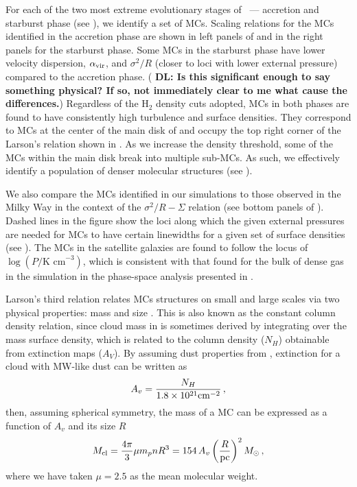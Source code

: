 \IfFileExists{emulateapjlegacy.cls}{\documentclass[iop]{emulateapjlegacy}}{\documentclass[iop]{emulateapj}}
\newcommand{\DL}[1]{({\bf \color{dlcolor} DL: #1})}
\begin{document}
For each of the two most extreme evolutionary stages of \flower\ --- accretion and starburst phase (see ), we identify a set of MCs. Scaling relations for the MCs identified in the accretion phase are shown in left panels of  and in the right panels for the starburst phase.
% 
Some MCs in the starburst phase have lower velocity dispersion, $\alpha_{\rm vir}$, and $\sigma^2/R$ (closer to loci with lower external pressure) compared to the accretion phase. \DL{Is this significant enough to say something physical? If so, not immediately clear to me what cause the differences.}
%
Regardless of the H$_2$ density cuts adopted, MCs in both phases are found to have consistently high turbulence and surface densities. They correspond to MCs at the center of the main disk of \flower and occupy the top right corner of the Larson's relation shown in . As we increase the density threshold, some of the MCs within the main disk break into multiple sub-MCs. As such, we effectively identify a population of denser molecular structures (see ).

We also compare the MCs identified in our simulations to those observed in the Milky Way in the context of the $\sigma^2/R - \Sigma$ relation (see bottom panels of ). Dashed lines in the figure show the loci along which the given external pressures are needed for MCs to have certain linewidths for a given set of surface densities (see ).
The MCs in the satellite galaxies are found to follow the locus of $\log{(P/\textrm{K cm}^{-3})}$, which
is consistent with that found for the bulk of dense gas in the simulation in the phase-space analysis presented in \citet{Pallottini17a}.

Larson's third relation relates MCs structures on small and large scales via two physical properties: mass and size \citep{Larson81a, McKee07a}. This is also known as the constant column density relation, since cloud mass in \obs is sometimes derived by integrating over the mass surface density, which is related to the column density ($N_H$) obtainable from extinction maps ($A_V$). By assuming dust properties from \citet[][]{weingartner:2001}, extinction for a cloud with MW-like dust can be written as 
\begin{equation}
A_v = \frac{N_H}{1.8 \times 10^{21} {\rm cm}^{-2}}\,,
\end{equation}
then, assuming spherical symmetry, the mass of a MC can be expressed as a function of $A_v$ and its size $R$
\begin{equation}\label{eqn:constantcolumndensity}
M_{\rm cl} = \frac{4\pi}{3} \mu m_p n R^3 = 154 \,A_v \left(\frac{R}{\rm pc}\right)^2 \Msun \,,
\end{equation}
where we have taken $\mu = 2.5$ as the mean molecular weight.
\end{document}
